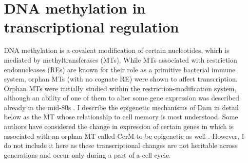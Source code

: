 
\section{DNA methylation in transcriptional regulation}
DNA methylation is a covalent modification of certain nucleotides, which is mediated by methyltransferases (MTs).
While MTs associated with restriction endonucleases (REs) are known for their role as a primitive bacterial immune system, orphan MTs (with no cognate RE) were shown to affect transcription.
Orphan MTs were initially studied within the restriction-modification system, although an ability of one of them to alter some gene expression was described already in the mid-80s \cite{sternberg1985evidence, bickle1993biology}.
I describe the epigenetic mechanisms of Dam in detail below as the MT whose relationship to cell memory is most understood.
Some authors have considered the change in expression of certain genes in  which is associated with an orphan MT called CcrM to be epigenetic as well \cite{casadesus2006epigenetic, adhikari2016dna}.
However, I do not include it here as these transcriptional changes are not heritable across generations and occur only during a part of a cell cycle.

